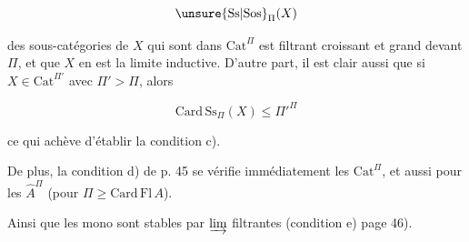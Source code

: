 \[
\unsure{\mathrm{Ss}|\mathrm{Sos}}_{\Pi}(X)
\]

des sous-catégories de $X$ qui sont dans $\mathrm{Cat}^{\Pi}$ est filtrant croissant et grand devant $\Pi$, et que $X$ en est la limite inductive. D'autre part, il est clair aussi que si $X\in\mathrm{Cat}^{\Pi'}$ avec $\Pi'>\Pi$, alors 

\[
\mathrm{Card}\,\mathrm{Ss}_{\Pi}(X)\leq{\Pi'}^{\Pi}
\]

ce qui achève d'établir la condition c).

De plus, la condition d) de p. 45 se vérifie immédiatement  les $\mathrm{Cat}^{\Pi}$, et aussi pour les $\widehat A^{\Pi}$ (pour $\Pi\geq\mathrm{Card}\,\mathrm{Fl}\,A$).

Ainsi que les mono sont stables par $\varinjlim$ filtrantes (condition e) page 46).
